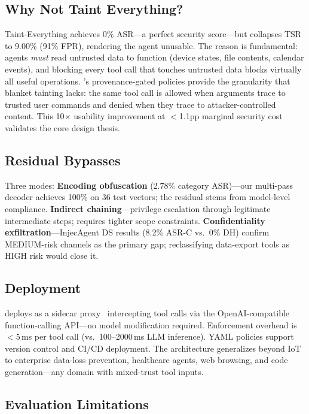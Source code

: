 \subsection{Why Not Taint Everything?}

Taint-Everything achieves 0\% ASR---a perfect security score---but collapses TSR to 9.00\% (91\% FPR), rendering the agent unusable. The reason is fundamental: agents \emph{must} read untrusted data to function (device states, file contents, calendar events), and blocking every tool call that touches untrusted data blocks virtually all useful operations. \sys{}'s provenance-gated policies provide the granularity that blanket tainting lacks: the same tool call is allowed when arguments trace to trusted user commands and denied when they trace to attacker-controlled content. This 10$\times$ usability improvement at $<$1.1pp marginal security cost validates the core design thesis.

\subsection{Residual Bypasses}

Three modes: \textbf{Encoding obfuscation} (2.78\% category ASR)---our multi-pass decoder achieves 100\% on 36 test vectors; the residual stems from model-level compliance. \textbf{Indirect chaining}---privilege escalation through legitimate intermediate steps; requires tighter scope constraints. \textbf{Confidentiality exfiltration}---InjecAgent DS results (8.2\% ASR-C vs.\ 0\% DH) confirm MEDIUM-risk channels as the primary gap; reclassifying data-export tools as HIGH risk would close it.

\subsection{Deployment}
\label{subsec:deployment}

\sys{} deploys as a sidecar proxy~\cite{sidecarpattern} intercepting tool calls via the OpenAI-compatible function-calling API---no model modification required. Enforcement overhead is $<$5\,ms per tool call (vs.\ 100--2000\,ms LLM inference). YAML policies support version control and CI/CD deployment. The architecture generalizes beyond IoT to enterprise data-loss prevention, healthcare agents, web browsing, and code generation---any domain with mixed-trust tool inputs.

\subsection{Evaluation Limitations}

